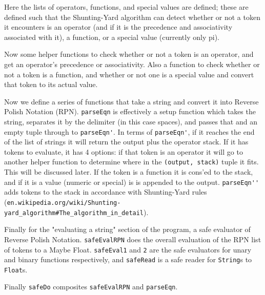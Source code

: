 \documentclass[12pt]{article}
\begin{document}
Here the lists of operators, functions, and special values are defined; these are defined such that the Shunting-Yard algorithm can detect whether or not a token it encounters is an operator (and if it is the precedence and associativity associated with it), a function, or a special value (currently only pi).



Now some helper functions to check whether or not a token is an operator, and get an operator's precedence or associativity.
Also a function to check whether or not a token is a function, and whether or not one is a special value and convert that token to its actual value.



Now we define a series of functions that take a string and convert it into Reverse Polish Notation (RPN).
\verb|parseEqn| is effectively a setup function which takes the string, separates it by the delimiter (in this case spaces), and passes that and an empty tuple through to \verb|parseEqn'|.
In terms of \verb|parseEqn'|, if it reaches the end of the list of strings it will return the output plus the operator stack.
If it has tokens to evaluate, it has 4 options: if that token is an operator it will go to another helper function to determine where in the \verb|(output, stack)| tuple it fits.
This will be discussed later.
If the token is a function it is cons'ed to the stack, and if it is a value (numeric or special) is is appended to the output.
\verb|parseEqn''| adds tokens to the stack in accordance with Shunting-Yard rules (\verb|en.wikipedia.org/wiki/Shunting-yard_algorithm#The_algorithm_in_detail|).



Finally for the "evaluating a string" section of the program, a safe evaluator of Reverse Polish Notation.
\verb|safeEvalRPN| does the overall evaluation of the RPN list of tokens to a Maybe Float.
\verb|safeEval1| and \verb|2| are the safe evaluators for unary and binary functions respectively, and \verb|safeRead| is a safe reader for \verb|String|s to \verb|Float|s.



Finally \verb|safeDo| composites \verb|safeEvalRPN| and \verb|parseEqn|.
\end{document}

